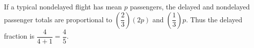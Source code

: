 If a typical nondelayed flight has mean $p$ passengers, the delayed and nondelayed passenger totals are proportional to $(\dfrac{2}{3})(2p)$ and $(\dfrac{1}{3})p$. Thus the delayed fraction is $\dfrac{4}{4+1}=\boxed{\dfrac{4}{5}}$.

